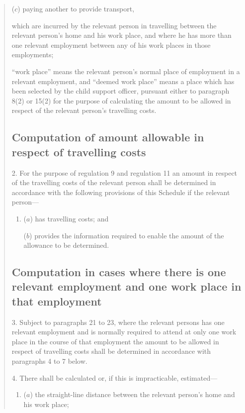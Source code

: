 \documentclass[12pt,a4paper]{article}
\begin{document}
\begin{quotation}
\begin{enumerate}
\begin{enumerate}
($c$) paying another to provide transport,
\end{enumerate}
which are incurred by the relevant person in travelling between the relevant person’s home and his work place, and where he has more than one relevant employment between any of his work places in those employments;

“work place” means the relevant person’s normal place of employment in a relevant employment, and “deemed work place” means a place which has been selected by the child support officer, pursuant either to paragraph 8(2) or 15(2) for the purpose of calculating the amount to be allowed in respect of the relevant person’s travelling costs.
\end{enumerate}

\subsection*{Computation of amount allowable in respect of travelling costs}

2.  For the purpose of regulation 9 and regulation 11 an amount in respect of the travelling costs of the relevant person shall be determined in accordance with the following provisions of this Schedule if the relevant person—
\begin{enumerate}\item[]
($a$) has travelling costs; and

($b$) provides the information required to enable the amount of the allowance to be determined.
\end{enumerate}

\subsection*{Computation in cases where there is one relevant employment and one work place in that employment}

3.  Subject to paragraphs 21 to 23, where the relevant persons has one relevant employment and is normally required to attend at only one work place in the course of that employment the amount to be allowed in respect of travelling costs shall be determined in accordance with paragraphs 4 to 7 below.

\medskip

4.  There shall be calculated or, if this is impracticable, estimated—
\begin{enumerate}\item[]
($a$) the straight-line distance between the relevant person’s home and his work place;


\end{enumerate}
\end{quotation}
\end{document}
